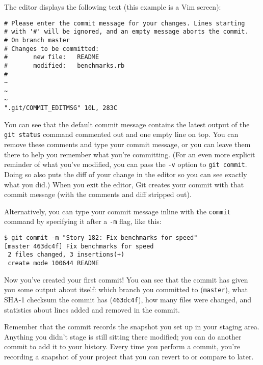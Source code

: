 \documentclass[a4paper]{book}
\begin{document}
The editor displays the following text (this example is a Vim screen):

\begin{shaded}\begin{verbatim}
# Please enter the commit message for your changes. Lines starting
# with '#' will be ignored, and an empty message aborts the commit.
# On branch master
# Changes to be committed:
#       new file:   README
#       modified:   benchmarks.rb
#
~
~
~
".git/COMMIT_EDITMSG" 10L, 283C
\end{verbatim}\end{shaded}

You can see that the default commit message contains the latest output of the \texttt{git status} command commented out and one empty line on top. You can remove these comments and type your commit message, or you can leave them there to help you remember what you're committing. (For an even more explicit reminder of what you've modified, you can pass the \texttt{-v} option to \texttt{git commit}. Doing so also puts the diff of your change in the editor so you can see exactly what you did.) When you exit the editor, Git creates your commit with that commit message (with the comments and diff stripped out).

Alternatively, you can type your commit message inline with the \texttt{commit} command by specifying it after a \texttt{-m} flag, like this:

\begin{shaded}\begin{verbatim}
$ git commit -m "Story 182: Fix benchmarks for speed"
[master 463dc4f] Fix benchmarks for speed
 2 files changed, 3 insertions(+)
 create mode 100644 README
\end{verbatim}\end{shaded}

Now you've created your first commit! You can see that the commit has given you some output about itself: which branch you committed to (\texttt{master}), what SHA-1 checksum the commit has (\texttt{463dc4f}), how many files were changed, and statistics about lines added and removed in the commit.

Remember that the commit records the snapshot you set up in your staging area. Anything you didn't stage is still sitting there modified; you can do another commit to add it to your history. Every time you perform a commit, you're recording a snapshot of your project that you can revert to or compare to later.
\end{document}
